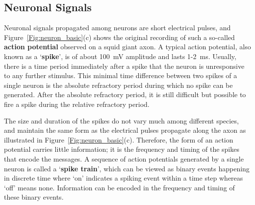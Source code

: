 %


\subsection{Neuronal Signals}
Neuronal signals propagated among neurons are short electrical pulses, and Figure~\ref{Fig:neuron_basic}(c) shows the original recording of such a so-called \textbf{action potential} observed on a squid giant axon.
A typical action potential, also known as a `\textbf{spike}', is of about 100~mV amplitude and lasts 1-2~ms.
Usually, there is a time period immediately after a spike that the neuron is unresponsive to any further stimulus.
This minimal time difference between two spikes of a single neuron is the absolute refractory period during which no spike can be generated.
After the absolute refractory period, it is still difficult but possible to 
fire a spike during the relative refractory period.

The size and duration of the spikes do not vary much among different species, and maintain the same form as the electrical pulses propagate along the axon as illustrated in Figure~\ref{Fig:neuron_basic}(c).
Therefore, the form of an action potential carries little information;
it is the frequency and timing of the spikes that encode the messages.
A sequence of action potentials generated by a single neuron is called a `\textbf{spike train}', which can be viewed as binary events happening in discrete time where `on' indicates a spiking event within a time step whereas `off' means none.
Information can be encoded in the frequency and timing of these binary events.



